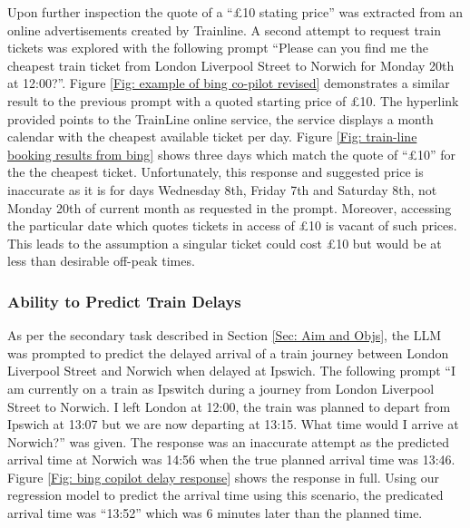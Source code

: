\noindent
Upon further inspection the quote of a ``£10 stating price'' was extracted from an online advertisements created by Trainline. A second attempt to request train tickets was explored with the following prompt ``Please can you find me the cheapest train ticket from London Liverpool Street to Norwich for Monday 20th at 12:00?''. Figure \ref{Fig: example of bing co-pilot revised} demonstrates a similar result to the previous prompt with a quoted starting price of £10. The hyperlink provided points to the TrainLine online service, the service displays a month calendar with the cheapest available ticket per day. Figure \ref{Fig: train-line booking results from bing} shows three days which match the quote of ``£10'' for the the cheapest ticket. Unfortunately, this response and suggested price is inaccurate as it is for days Wednesday 8th, Friday 7th and Saturday 8th, not Monday 20th of current month as requested in the prompt. Moreover, accessing the particular date which quotes tickets in access of £10 is vacant of such prices. This leads to the assumption a singular ticket could cost £10 but would be at less than desirable off-peak times.

\subsubsection{Ability to Predict Train Delays}\label{Sec: Co-pilot delay prediction}
As per the secondary task described in Section \ref{Sec: Aim and Objs}, the LLM was prompted to predict the delayed arrival of a train journey between London Liverpool Street and Norwich when delayed at Ipswich. The following prompt ``I am currently on a train as Ipswitch during a journey from London Liverpool Street to Norwich. I left London at 12:00, the train was planned to depart from Ipswich at 13:07 but we are now departing at 13:15. What time would I arrive at Norwich?'' was given. The response was an inaccurate attempt as the predicted arrival time at Norwich was 14:56 when the true planned arrival time was 13:46. %
Figure \ref{Fig: bing copilot delay response} shows the response in full. Using our regression model to predict the arrival time using this scenario, the predicated arrival time was ``13:52'' which was 6 minutes later than the planned time. 


